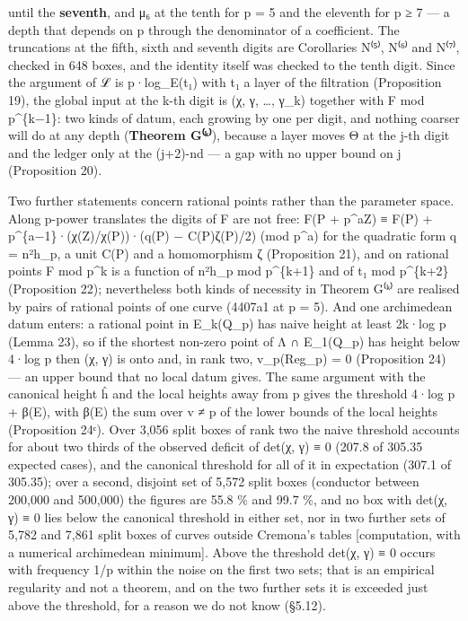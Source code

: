 \documentclass[11pt,a4paper]{article}
\theoremstyle{named}
\begin{document}
until the \textbf{seventh}, and μ₆ at the tenth for p = 5 and the eleventh for p ≥ 7 — a depth that depends on p through the denominator of a coefficient. The truncations at the fifth, sixth and seventh digits are Corollaries N⁽⁵⁾, N⁽⁶⁾ and N⁽⁷⁾, checked in 648 boxes, and the identity itself was checked to the tenth digit. Since the argument of ℒ is p·log\_E(t₁) with t₁ a layer of the filtration (Proposition 19), the global input at the k-th digit is (χ, γ, …, γ\_k) together with F mod p\textasciicircum{}\{k−1\}: two kinds of datum, each growing by one per digit, and nothing coarser will do at any depth (\textbf{Theorem G⁽ᵏ⁾}), because a layer moves Θ at the j-th digit and the ledger only at the (j+2)-nd — a gap with no upper bound on j (Proposition 20).

Two further statements concern rational points rather than the parameter space. Along p-power translates the digits of F are not free: F(P + p\textasciicircum{}aZ) ≡ F(P) + p\textasciicircum{}\{a−1\}·(χ(Z)/χ(P))·(q(P) − C(P)ζ(P)/2) (mod p\textasciicircum{}a) for the quadratic form q = n²h\_p, a unit C(P) and a homomorphism ζ (Proposition 21), and on rational points F mod p\textasciicircum{}k is a function of n²h\_p mod p\textasciicircum{}\{k+1\} and of t₁ mod p\textasciicircum{}\{k+2\} (Proposition 22); nevertheless both kinds of necessity in Theorem G⁽ᵏ⁾ are realised by pairs of rational points of one curve (4407a1 at p = 5). And one archimedean datum enters: a rational point in E\_k(Q\_p) has naive height at least 2k·log p (Lemma 23), so if the shortest non-zero point of Λ ∩ E\_1(Q\_p) has height below 4·log p then (χ, γ) is onto and, in rank two, v\_p(Reg\_p) = 0 (Proposition 24) — an upper bound that no local datum gives. The same argument with the canonical height ĥ and the local heights away from p gives the threshold 4·log p + β(E), with β(E) the sum over v ≠ p of the lower bounds of the local heights (Proposition 24ᶜ). Over 3,056 split boxes of rank two the naive threshold accounts for about two thirds of the observed deficit of det(χ, γ) ≡ 0 (207.8 of 305.35 expected cases), and the canonical threshold for all of it in expectation (307.1 of 305.35); over a second, disjoint set of 5,572 split boxes (conductor between 200,000 and 500,000) the figures are 55.8 \% and 99.7 \%, and no box with det(χ, γ) ≡ 0 lies below the canonical threshold in either set, nor in two further sets of 5,782 and 7,861 split boxes of curves outside Cremona's tables [computation, with a numerical archimedean minimum]. Above the threshold det(χ, γ) ≡ 0 occurs with frequency 1/p within the noise on the first two sets; that is an empirical regularity and not a theorem, and on the two further sets it is exceeded just above the threshold, for a reason we do not know (§5.12).
\end{document}
